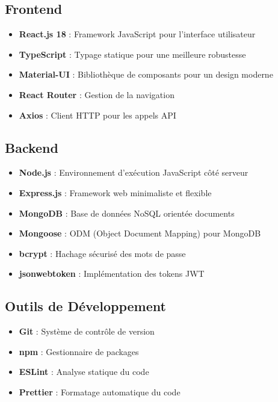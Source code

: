 \documentclass[12pt,a4paper]{article}
\begin{document}
\subsection{Frontend}
\begin{itemize}
    \item \textbf{React.js 18} : Framework JavaScript pour l'interface utilisateur
    \item \textbf{TypeScript} : Typage statique pour une meilleure robustesse
    \item \textbf{Material-UI} : Bibliothèque de composants pour un design moderne
    \item \textbf{React Router} : Gestion de la navigation
    \item \textbf{Axios} : Client HTTP pour les appels API
\end{itemize}

\subsection{Backend}
\begin{itemize}
    \item \textbf{Node.js} : Environnement d'exécution JavaScript côté serveur
    \item \textbf{Express.js} : Framework web minimaliste et flexible
    \item \textbf{MongoDB} : Base de données NoSQL orientée documents
    \item \textbf{Mongoose} : ODM (Object Document Mapping) pour MongoDB
    \item \textbf{bcrypt} : Hachage sécurisé des mots de passe
    \item \textbf{jsonwebtoken} : Implémentation des tokens JWT
\end{itemize}

\subsection{Outils de Développement}
\begin{itemize}
    \item \textbf{Git} : Système de contrôle de version
    \item \textbf{npm} : Gestionnaire de packages
    \item \textbf{ESLint} : Analyse statique du code
    \item \textbf{Prettier} : Formatage automatique du code
\end{itemize}
\end{document}
